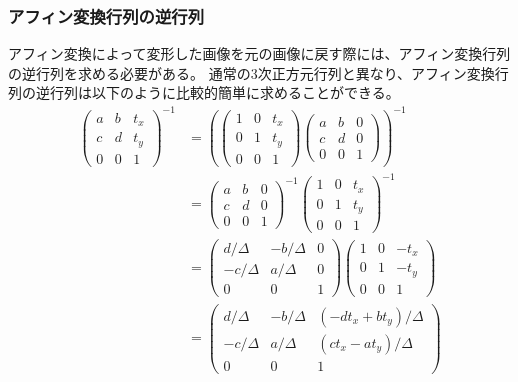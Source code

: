    \subsubsection{アフィン変換行列の逆行列}
        アフィン変換によって変形した画像を元の画像に戻す際には、アフィン変換行列の逆行列を求める必要がある。
        通常の3次正方元行列と異なり、アフィン変換行列の逆行列は以下のように比較的簡単に求めることができる。
        \begin{align}
            \left(
            \begin{array}{ccc}
                a&b&t_x\\ c&d&t_y\\ 0&0&1 
            \end{array}
            \right)^{-1} 
        &=  \left( 
                \left(
                \begin{array}{ccc}
                    1&0&t_x\\ 0&1&t_y\\ 0&0&1 
                \end{array}
                \right)
                \left(
                \begin{array}{ccc}
                    a&b&0\\ c&d&0\\ 0&0&1
                \end{array}
                \right)
            \right) ^ {-1} \\ 
        &=  \left(
            \begin{array}{ccc}
                a&b&0\\ c&d&0\\ 0&0&1
            \end{array}\right)^{-1}
            \left(
            \begin{array}{ccc}
                1&0&t_x\\ 0&1&t_y\\ 0&0&1
            \end{array}\right)^{-1} \\
        &= \left(
            \begin{array}{ccc}
                d/\Delta{}&-b/\Delta{}&0\\ -c/\Delta{}&a/\Delta{}&0\\ 0&0&1 
            \end{array}
            \right)
            \left(
            \begin{array}{ccc}
                1&0&-t_x\\ 0&1&-t_y\\ 0&0&1
            \end{array}\right)\\
        &= \left(
            \begin{array}{ccc}
            d/\Delta{}&-b/\Delta{}&(-dt_x+bt_y)/\Delta{}\\ -c/\Delta{}&a/\Delta{}&(ct_x-at_y)/\Delta{}\\ 0&0&1
            \end{array}
            \right)
        \end{align}
        

